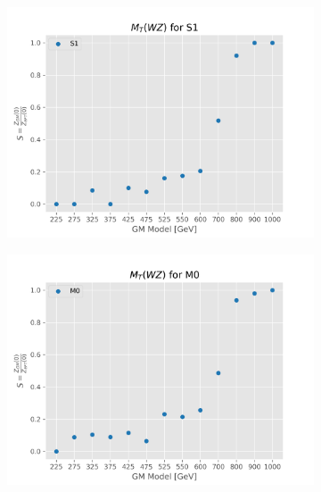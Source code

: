 \documentclass[../Bachelorarbeit.tex]{subfiles}
\begin{document}
\begin{figure}[h]
    \centering
    \begin{subfigure}{0.45\textwidth}
        \includegraphics[width=\textwidth]{Plots/gm_relevanze/MTWZ_op_S1.png}

    \end{subfigure}
    \begin{subfigure}{0.45\textwidth}
        \includegraphics[width=\textwidth]{Plots/gm_relevanze/MTWZ_op_M0.png}


\end{subfigure}
\end{figure}
\end{document}

